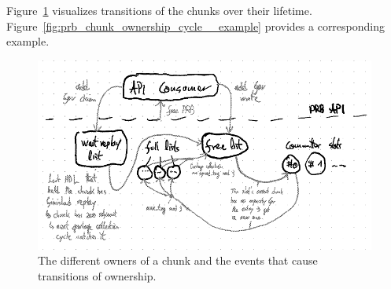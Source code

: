\documentclass[12pt,a4paper,twoside]{book}
\begin{document}
Figure~\ref{fig:prb_chunk_ownership_cycle__transitions} visualizes transitions of the chunks over their lifetime.
Figure~\ref{fig:prb_chunk_ownership_cycle__example} provides a corresponding example.

\begin{figure}[H]
    \centering
    \includegraphics{fig/prb_chunk_ownership_cycle__transitions}
    \caption{The different owners of a chunk and the events that cause transitions of ownership.}
    \label{fig:prb_chunk_ownership_cycle__transitions}
\end{figure}
\end{document}
